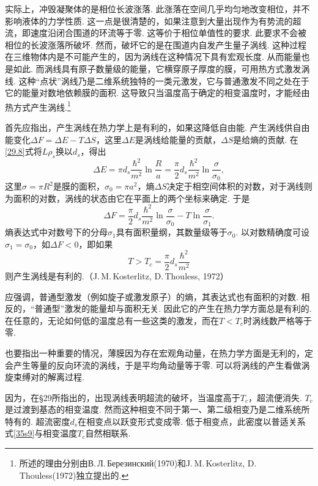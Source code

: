 实际上，冲毁凝聚体的是相位长波涨落. 此涨落在空间几乎均匀地改变相位，并不影响液体的力学性质. 这一点是很清楚的，如果注意到大量出现作为有势流的超流，即速度沿闭合围道的环流等于零. 这等价于相位单值性的要求. 此要求不会被相位的长波涨落所破坏. 然而，破坏它的是在围道内自发产生量子涡线. 这种过程在三维物体内是不可能产生的，因为涡线在这种情况下具有宏观长度. 从而能量也是如此. 而涡线具有原子数量级的能量，它横穿原子厚度的膜，可用热方式激发涡线. 这种“点状”涡线乃是二维系统独特的一类元激发，它与普通激发不同之处在于它的能量对数地依赖膜的面积. 这导致只当温度高于确定的相变温度时，才能经由热方式产生涡线.\footnote{所述的理由分别由В.\,Л.\,Березинский(1970)和J.\,M.\,Kosterlitz, D.\,Thouless(1972)独立提出的.}

首先应指出，产生涡线在热力学上是有利的，如果这降低自由能. 产生涡线供自由能变化$\Delta F=\Delta E-T\Delta S$，这里$\Delta E$是涡线给能量的贡献，$\Delta S$是给熵的贡献. 在\eqref{29.8}式将$L\rho_{s}$换以$d_{s}$，得出
\begin{equation*}
\Delta E=\pi d_{s}\frac{\hbar^{2}}{m^{2}}\ln\frac{R}{a}
=\frac{\pi}{2}d_{s}\frac{\hbar^{2}}{m^{2}}\ln\frac{\sigma}{\sigma_{0}},
\end{equation*}
这里$\sigma=\pi R^{2}$是膜的面积，$\sigma_{0}=\pi a^{2}$，熵$\Delta S$决定于相空间体积的对数，对于涡线则为面积的对数，涡线的状态由它在平面上的两个坐标来确定. 于是
\begin{equation*}
\Delta F=\frac{\pi}{2}d_{s}\frac{\hbar^{2}}{m^{2}}\ln\frac{\sigma}{\sigma_{0}}
-T\ln\frac{\sigma}{\sigma_{1}}.
\tag{35*.8}
\label{35s8}
\end{equation*}
熵表达式中对数号下的分母$\sigma_{1}$具有面积量纲，其数量级等于$\sigma_{0}$. 以对数精确度可设$\sigma_{1}=\sigma_{0}$，如$\Delta F<0$，即如果
\begin{equation*}
T>T_{c}=\frac{\pi}{2}d_{s}\frac{\hbar^{2}}{m^{2}}
\tag{35*.9}
\label{35s9}
\end{equation*}
则产生涡线是有利的.（J.\,M.\,Kosterlitz, D.\,Thouless, 1972）

应强调，普通型激发（例如旋子或激发原子）的熵，其表达式也有面积的对数. 相反的，“普通型”激发的能量却与面积无关. 因此它的产生在热力学方面总是有利的. 在任意的，无论如何低的温度总有一些这类的激发，而在$T<T_{c}$时涡线数严格等于零.

也要指出一种重要的情况，薄膜因为存在宏观角动量，在热力学方面是无利的，定会产生等量的反向环流的涡线，于是平均角动量等于零. 可以将涡线的产生看做涡旋束缚对的解离过程.

因为，在§29所指出的，出现涡线表明超流的破坏，当温度高于$T_{c}$，超流便消失. $T_{c}$是过渡到基态的相变温度. 然而这种相变不同于第一、第二级相变乃是二维系统所特有的. 超流密度$d_{s}$在相变点以跃变形式变成零. 低于相变点，此密度以普适关系式\eqref{35s9}与相变温度$T_{c}$自然相联系.

